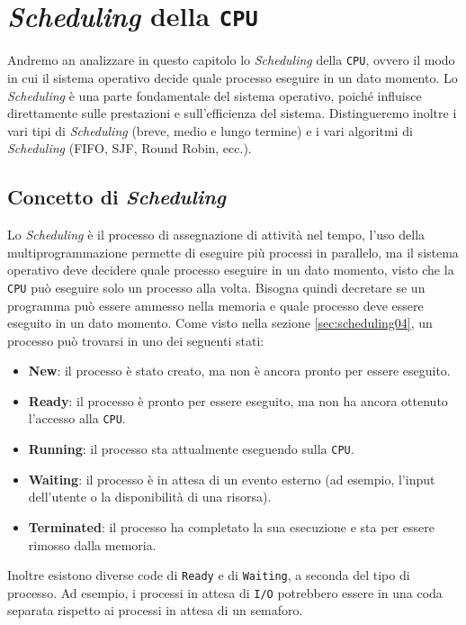 \chapter{\textit{Scheduling} della \texttt{CPU}}

Andremo an analizzare in questo capitolo lo \textit{Scheduling} della \texttt{CPU}, ovvero il modo in cui il sistema operativo decide quale processo eseguire in un dato momento. Lo \textit{Scheduling} è una parte fondamentale del sistema operativo, poiché influisce direttamente sulle prestazioni e sull'efficienza del sistema. Distingueremo inoltre i vari tipi di \textit{Scheduling} (breve, medio e lungo termine) e i vari algoritmi di \textit{Scheduling} (FIFO, SJF, Round Robin, ecc.).

\section{Concetto di \textit{Scheduling}}
    Lo \textit{Scheduling} è il processo di assegnazione di attività nel tempo, l'uso della multiprogrammazione permette di eseguire più processi in parallelo, ma il sistema operativo deve decidere quale processo eseguire in un dato momento, visto che la \texttt{CPU} può eseguire solo un processo alla volta. Bisogna quindi decretare se un programma può essere ammesso nella memoria e quale processo deve essere eseguito in un dato momento. \newline
    Come visto nella sezione \ref{sec:scheduling04}, un processo può trovarsi in uno dei seguenti stati:
    \begin{itemize}
        \item \textbf{New}: il processo è stato creato, ma non è ancora pronto per essere eseguito.
        \item \textbf{Ready}: il processo è pronto per essere eseguito, ma non ha ancora ottenuto l'accesso alla \texttt{CPU}.
        \item \textbf{Running}: il processo sta attualmente eseguendo sulla \texttt{CPU}.
        \item \textbf{Waiting}: il processo è in attesa di un evento esterno (ad esempio, l'input dell'utente o la disponibilità di una risorsa).
        \item \textbf{Terminated}: il processo ha completato la sua esecuzione e sta per essere rimosso dalla memoria.
    \end{itemize}
    Inoltre esistono diverse code di \texttt{Ready} e di \texttt{Waiting}, a seconda del tipo di processo. Ad esempio, i processi in attesa di \texttt{I/O} potrebbero essere in una coda separata rispetto ai processi in attesa di un semaforo. 
